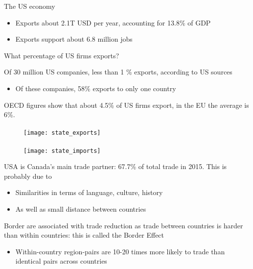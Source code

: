 \documentclass{beamer}
\begin{document}
\begin{frame}
  The US economy
  \begin{itemize}
    \item Exports about 2.1T USD per year, accounting for 13.8\% of GDP
    \item Exports support about 6.8 million jobs
  \end{itemize}
  \medskip
  What percentage of US firms exports?
\end{frame}


\begin{frame}
  Of 30 million US companies, less than 1 \% exports, according to US sources
  \begin{itemize}
    \item Of these companies, 58\% exports to only one country
  \end{itemize}
  \medskip
  OECD figures show that about 4.5\% of US firms export, in the EU the average is 6\%.
\end{frame}

\begin{frame}{}
\framesubtitle{}
  \begin{figure}
    \texttt{[image: state\_exports]}
  \end{figure}  
\end{frame}

\begin{frame}{}
\framesubtitle{}
  \begin{figure}
    \texttt{[image: state\_imports]}
  \end{figure}  
\end{frame}

\begin{frame}
  USA is Canada's main trade partner: 67.7\% of total trade in 2015.
  This is probably due to 
  \begin{itemize}
    \item Similarities in terms of language, culture, history
    \item As well as small distance between countries
  \end{itemize}
  \medskip
  Border are associated with trade reduction as trade between countries is harder than within countries: this is called the Border Effect
  \begin{itemize}
    \item Within-country region-pairs are 10-20 times more likely to trade than identical pairs across countries
  \end{itemize}
\end{frame}
\end{document}
